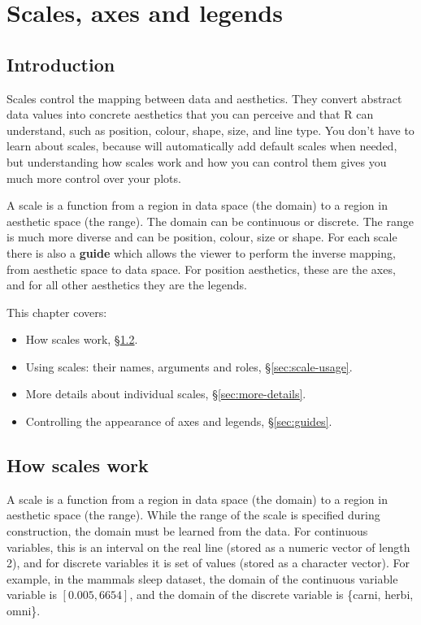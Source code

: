 
\chapter{Scales, axes and legends}
\label{cha:scales}

\section{Introduction}

Scales control the mapping between data and aesthetics.  They convert abstract data values into concrete aesthetics that you can perceive and that R can understand, such as position, colour, shape, size, and line type.  You don't have to learn about scales, because \ggplot will automatically add default scales when needed, but understanding how scales work and how you can control them gives you much more control over your plots. 

A scale is a function from a region in data space (the domain) to a region in aesthetic space (the range).  The domain can be continuous or discrete.  The range is much more diverse and can be position, colour, size or shape.  For each scale there is also a {\bf guide} which allows the viewer to perform the inverse mapping, from aesthetic space to data space.  For position aesthetics, these are the axes, and for all other aesthetics they are the legends.


This chapter covers:

\begin{itemize}
  \item How scales work, \S \ref{sec:how-scales-work}.
  \item Using scales: their names, arguments and roles, \S \ref{sec:scale-usage}.
  \item More details about individual scales, \S \ref{sec:more-details}.
  \item Controlling the appearance of axes and legends, \S \ref{sec:guides}.
\end{itemize}

\section{How scales work}
\label{sec:how-scales-work}

A scale is a function from a region in data space (the domain) to a region in aesthetic space (the range).  While the range of the scale is specified during construction, the domain must be learned from the data. For continuous variables, this is an interval on the real line (stored as a numeric vector of length 2), and for discrete variables it is set of values (stored as a character vector).  For example, in the mammals sleep dataset, the domain of the continuous variable  variable is $[0.005, 6654]$, and the domain of the discrete variable  is \{carni, herbi, omni\}.

